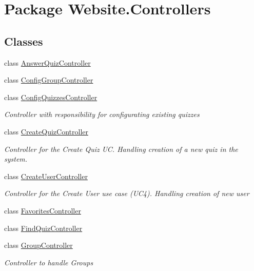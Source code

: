 \hypertarget{namespace_website_1_1_controllers}{}\section{Package Website.\+Controllers}
\label{namespace_website_1_1_controllers}
\subsection*{Classes}
\begin{DoxyCompactItemize}
\item 
class \hyperlink{class_website_1_1_controllers_1_1_answer_quiz_controller}{Answer\+Quiz\+Controller}
\item 
class \hyperlink{class_website_1_1_controllers_1_1_config_group_controller}{Config\+Group\+Controller}
\item 
class \hyperlink{class_website_1_1_controllers_1_1_config_quizzes_controller}{Config\+Quizzes\+Controller}
\begin{DoxyCompactList}\small\item\em Controller with responsibility for configurating existing quizzes \end{DoxyCompactList}\item 
class \hyperlink{class_website_1_1_controllers_1_1_create_quiz_controller}{Create\+Quiz\+Controller}
\begin{DoxyCompactList}\small\item\em Controller for the Create Quiz U\+C. Handling creation of a new quiz in the system. \end{DoxyCompactList}\item 
class \hyperlink{class_website_1_1_controllers_1_1_create_user_controller}{Create\+User\+Controller}
\begin{DoxyCompactList}\small\item\em Controller for the Create User use case (U\+C4). Handling creation of new user \end{DoxyCompactList}\item 
class \hyperlink{class_website_1_1_controllers_1_1_favorites_controller}{Favorites\+Controller}
\item 
class \hyperlink{class_website_1_1_controllers_1_1_find_quiz_controller}{Find\+Quiz\+Controller}
\item 
class \hyperlink{class_website_1_1_controllers_1_1_group_controller}{Group\+Controller}
\begin{DoxyCompactList}\small\item\em Controller to handle Groups \end{DoxyCompactList}\item 

\end{DoxyCompactItemize}

